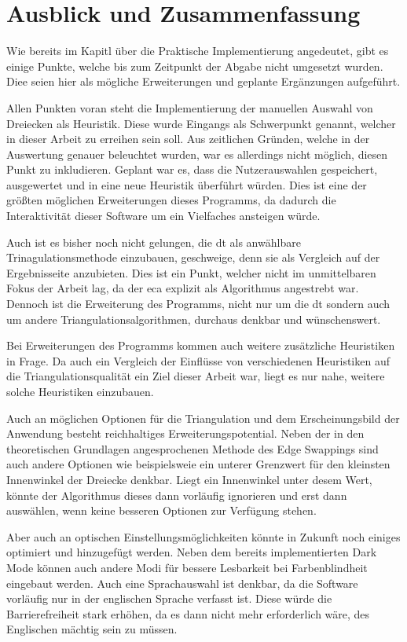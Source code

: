 \section{Ausblick und Zusammenfassung}
Wie bereits im Kapitl über die Praktische Implementierung angedeutet, gibt es einige Punkte, welche bis zum Zeitpunkt der Abgabe nicht umgesetzt wurden.
Diee seien hier als mögliche Erweiterungen und geplante Ergänzungen aufgeführt.

Allen Punkten voran steht die Implementierung der manuellen Auswahl von Dreiecken als Heuristik. Diese wurde Eingangs als Schwerpunkt genannt, welcher in dieser Arbeit zu erreihen sein soll. 
Aus zeitlichen Gründen, welche in der Auswertung genauer beleuchtet wurden, war es allerdings nicht möglich, diesen Punkt zu inkludieren. Geplant war es, dass die Nutzerauswahlen gespeichert, 
ausgewertet und in eine neue Heuristik überführt würden. Dies ist eine der größten möglichen Erweiterungen dieses Programms, da dadurch die Interaktivität dieser Software um ein Vielfaches 
ansteigen würde.

Auch ist es bisher noch nicht gelungen, die \ac{dt} als anwählbare Trinagulationsmethode einzubauen, geschweige, denn sie als Vergleich auf der Ergebnisseite 
anzubieten. Dies ist ein Punkt, welcher nicht im unmittelbaren Fokus der Arbeit lag, da der \ac{eca} explizit als Algorithmus angestrebt war.
Dennoch ist die Erweiterung des Programms, nicht nur um die \ac{dt} sondern auch um andere Triangulationsalgorithmen, durchaus denkbar und wünschenswert.

Bei Erweiterungen des Programms kommen auch weitere zusätzliche Heuristiken in Frage. Da auch ein Vergleich der Einflüsse von verschiedenen Heuristiken auf die Triangulationsqualität ein Ziel dieser 
Arbeit war, liegt es nur nahe, weitere solche Heuristiken einzubauen.

Auch an möglichen Optionen für die Triangulation und dem Erscheinungsbild der Anwendung besteht reichhaltiges Erweiterungspotential. Neben der in den theoretischen Grundlagen angesprochenen Methode des 
Edge Swappings sind auch andere Optionen wie beispielsweie ein unterer Grenzwert für den kleinsten Innenwinkel der Dreiecke denkbar. Liegt ein Innenwinkel unter desem Wert, könnte der Algorithmus dieses dann 
vorläufig ignorieren und erst dann auswählen, wenn keine besseren Optionen zur Verfügung stehen.

Aber auch an optischen Einstellungsmöglichkeiten könnte in Zukunft noch einiges optimiert und hinzugefügt werden. Neben dem bereits implementierten Dark Mode können auch andere Modi für bessere Lesbarkeit bei Farbenblindheit 
eingebaut werden. Auch eine Sprachauswahl ist denkbar, da die Software vorläufig nur in der englischen Sprache verfasst ist. Diese würde die Barrierefreiheit stark erhöhen, da es dann nicht mehr erforderlich wäre, des Englischen mächtig sein 
zu müssen.

